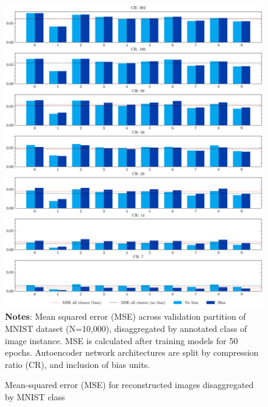 \begin{figure}
    \caption{Mean-squared error (MSE) for reconstructed images disaggregated by MNIST class}
	\label{fig:mse-by-class}
	\includegraphics[width=1.0\textwidth]{graphics/mse_by_class.pdf}
    \textbf{Notes}: Mean squared error (MSE) across validation partition of MNIST dataset (N=10,000), disaggregated by annotated class of image instance. MSE is calculated after training models for 50 epochs. Autoencoder network architectures are split by compression ratio (CR), and inclusion of bias units.
\end{figure}


